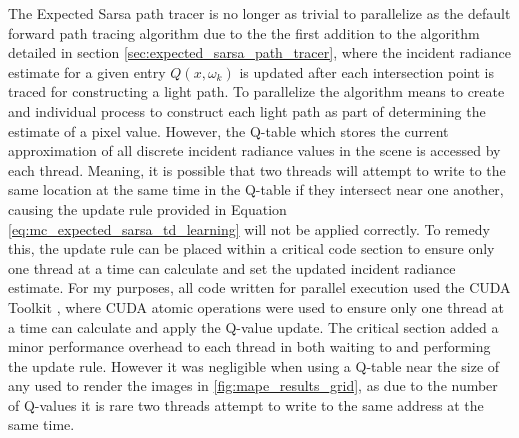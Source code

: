 \documentclass[../dissertation.tex]{subfiles}
\begin{document}
The Expected Sarsa path tracer is no longer as trivial to parallelize as the default forward path tracing algorithm due to the the first addition to the algorithm detailed in section \ref{sec:expected_sarsa_path_tracer}, where the incident radiance estimate for a given entry $Q(x,\omega_k)$ is updated after each intersection point is traced for constructing a light path. To parallelize the algorithm means to create and individual process to construct each light path as part of determining the estimate of a pixel value. However, the Q-table which stores the current approximation of all discrete incident radiance values in the scene is accessed by each thread. Meaning, it is possible that two threads will attempt to write to the same location at the same time in the Q-table if they intersect near one another, causing the update rule provided in Equation \ref{eq:mc_expected_sarsa_td_learning} will not be applied correctly. To remedy this, the update rule can be placed within a critical code section \cite{raynal2012concurrent} to ensure only one thread at a time can calculate and set the updated incident radiance estimate. For my purposes, all code written for parallel execution used the CUDA Toolkit \cite{cuda}, where CUDA atomic operations were used to ensure only one thread at a time can calculate and apply the Q-value update. The critical section added a minor performance overhead to each thread in both waiting to and performing the update rule. However it was negligible when using a Q-table near the size of any used to render the images in \ref{fig:mape_results_grid}, as due to the number of Q-values it is rare two threads attempt to write to the same address at the same time.\\ 
\end{document}
